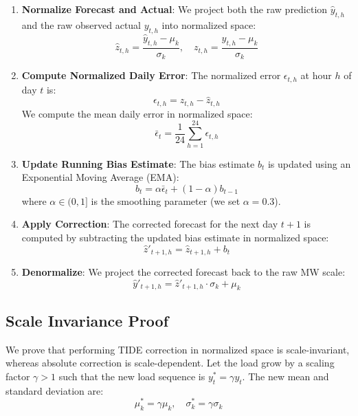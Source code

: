\documentclass[journal]{IEEEtran}
\begin{document}
\begin{enumerate}
    \item \textbf{Normalize Forecast and Actual}: We project both the raw prediction $\hat{y}_{t,h}$ and the raw observed actual $y_{t,h}$ into normalized space:
    \begin{equation}
    \hat{z}_{t,h} = \frac{\hat{y}_{t,h} - \mu_k}{\sigma_k}, \quad z_{t,h} = \frac{y_{t,h} - \mu_k}{\sigma_k}
    \end{equation}
    
    \item \textbf{Compute Normalized Daily Error}: The normalized error $\epsilon_{t,h}$ at hour $h$ of day $t$ is:
    \begin{equation}
    \epsilon_{t,h} = z_{t,h} - \hat{z}_{t,h}
    \end{equation}
    We compute the mean daily error in normalized space:
    \begin{equation}
    \bar{\epsilon}_t = \frac{1}{24} \sum_{h=1}^{24} \epsilon_{t,h}
    \end{equation}
    
    \item \textbf{Update Running Bias Estimate}: The bias estimate $b_t$ is updated using an Exponential Moving Average (EMA):
    \begin{equation}
    b_t = \alpha \bar{\epsilon}_t + (1 - \alpha) b_{t-1}
    \end{equation}
    where $\alpha \in (0, 1]$ is the smoothing parameter (we set $\alpha = 0.3$).
    
    \item \textbf{Apply Correction}: The corrected forecast for the next day $t+1$ is computed by subtracting the updated bias estimate in normalized space:
    \begin{equation}
    \hat{z}'_{t+1,h} = \hat{z}_{t+1,h} + b_t
    \end{equation}
    
    \item \textbf{Denormalize}: We project the corrected forecast back to the raw MW scale:
    \begin{equation}
    \hat{y}'_{t+1,h} = \hat{z}'_{t+1,h} \cdot \sigma_k + \mu_k
    \end{equation}
\end{enumerate}

\subsection{Scale Invariance Proof}
We prove that performing TIDE correction in normalized space is scale-invariant, whereas absolute correction is scale-dependent. Let the load grow by a scaling factor $\gamma > 1$ such that the new load sequence is $y^*_t = \gamma y_t$. The new mean and standard deviation are:
\begin{equation}
\mu^*_k = \gamma \mu_k, \quad \sigma^*_k = \gamma \sigma_k
\end{equation}
\end{document}
